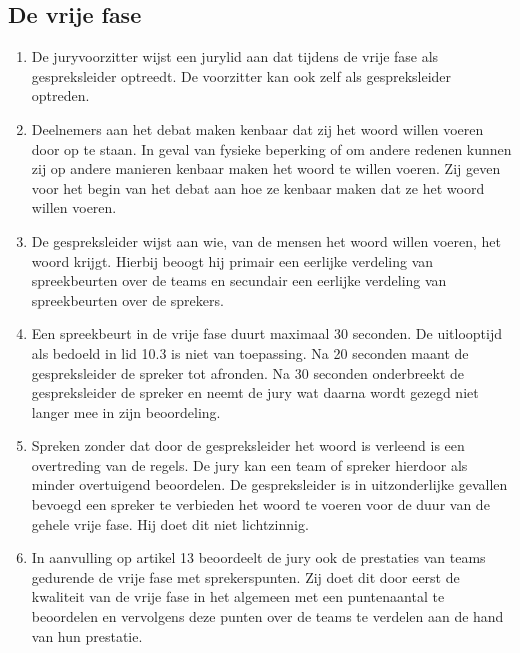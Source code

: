 \subsection{De vrije fase}

\begin{enumerate}
\item De juryvoorzitter wijst een jurylid aan dat tijdens de vrije fase als gespreksleider optreedt. De voorzitter kan ook zelf als gespreksleider optreden. 
\item Deelnemers aan het debat maken kenbaar dat zij het woord willen voeren door op te staan. In geval van fysieke beperking of om andere redenen kunnen zij op andere manieren kenbaar maken het woord te willen voeren. Zij geven voor het begin van het debat aan hoe ze kenbaar maken dat ze het woord willen voeren.
\item De gespreksleider wijst aan wie, van de mensen het woord willen voeren, het woord krijgt. Hierbij beoogt hij primair een eerlijke verdeling van spreekbeurten over de teams en secundair een eerlijke verdeling van spreekbeurten over de sprekers.
\item Een spreekbeurt in de vrije fase duurt maximaal 30 seconden. De uitlooptijd als bedoeld in lid 10.3 is niet van toepassing. Na 20 seconden maant de gespreksleider de spreker tot afronden. Na 30 seconden onderbreekt de gespreksleider de spreker en neemt de jury wat daarna wordt gezegd niet langer mee in zijn beoordeling.
\item Spreken zonder dat door de gespreksleider het woord is verleend is een overtreding van de regels. De jury kan een team of spreker hierdoor als minder overtuigend beoordelen. De gespreksleider is in uitzonderlijke gevallen bevoegd een spreker te verbieden het woord te voeren voor de duur van de gehele vrije fase. Hij doet dit niet lichtzinnig.
\item In aanvulling op artikel 13 beoordeelt de jury ook de prestaties van teams gedurende de vrije fase met sprekerspunten. Zij doet dit door eerst de kwaliteit van de vrije fase in het algemeen met een puntenaantal te beoordelen en vervolgens deze punten over de teams te verdelen aan de hand van hun prestatie.
\end{enumerate}
